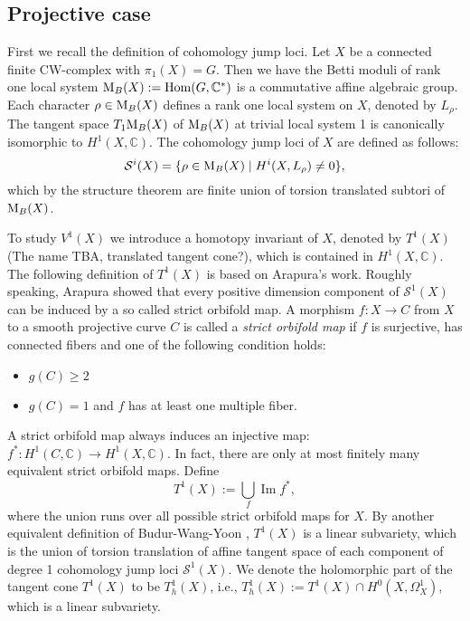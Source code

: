 \documentclass[12pt,reqno]{amsart}
\theoremstyle{question}
\theoremstyle{definition}
\theoremstyle{remark}
\theoremstyle{cited}
\theoremstyle{citeddef}
\newcommand{\C}{\mathbb{C}}
\newcommand{\Hom}{\mathrm{Hom}}
\DeclareMathOperator{\im}{Im}
\begin{document}
\subsection{Projective case}


First we recall the definition of cohomology jump loci. Let $X$ be a connected finite CW-complex with $\pi_{1}(X)=G$. Then we have the Betti moduli of rank one local system $\textnormal{M}_B(X):= \Hom(G,\C^{\ast})$ is a commutative affine algebraic group. Each character $\rho \in \textnormal{M}_B(X)$ defines a rank one local system on $X$, denoted by $L_{\rho}$. The tangent space $T_1\textnormal{M}_B(X)$ of $\textnormal{M}_B(X)$ at trivial local system 1 is canonically isomorphic to $H^1(X, \C)$.
The cohomology jump loci of $X$ are defined as follows:
$$\mathcal{S}^i(X)=\lbrace \rho\in \textnormal{M}_B(X) \mid  H^{i}(X, L_{\rho})\neq 0 \rbrace,$$ 
which by the structure theorem are finite union of torsion translated subtori of $\textnormal{M}_B(X)$.

To study $V^1(X)$ we introduce a homotopy invariant of $X$, denoted by $T^1(X)${\color{red} (The name TBA, translated tangent cone?)}, which is contained in $H^1(X, \C)$. The following definition of $T^1(X)$ is based on Arapura's work. Roughly speaking, Arapura \cite{Ara97} showed that every positive dimension component of $\mathcal{S}^1(X)$ can be induced by a so called strict orbifold map. A morphism $f:X\to C$ from $X$ to a smooth projective curve $C$ is called a  {\it strict orbifold map} if $f $ is surjective, has connected fibers and one of the following condition holds:
\begin{itemize}
\item $g(C)\geq 2$
\item $g(C)=1$ and $f$ has at least one multiple fiber.
\end{itemize}
A strict orbifold map always induces an injective map: $f^*: H^1(C, \C) \to H^1(X,\C)$. In fact, there are only at most finitely many equivalent strict orbifold maps. Define $$T^1(X):= \bigcup_f \im f^*,$$
where the union runs over all possible strict orbifold maps for $X$. By another equivalent definition of Budur-Wang-Yoon \cite{BWY16} , $T^1(X)$ is a linear subvariety, which is the union of torsion translation of affine tangent space of each component of degree 1 cohomology jump loci $\mathcal{S}^1(X)$. We denote the holomorphic part of the tangent cone $T^1(X)$ to be $T^1_h(X)$, i.e., $T_h^1(X):=T^1(X)\cap H^0(X, \Omega_X^1)$, which is a linear subvariety.
\end{document}
